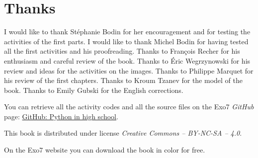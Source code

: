 
\clearemptydoublepage
\pagestyle{empty}\thispagestyle{empty}

\vspace*{\fill}

\section*{Thanks}


I would like to thank Stéphanie Bodin for her encouragement and for testing the activities of the first parts.
I would like to thank Michel Bodin for having tested all the first activities and his proofreading.
Thanks to François Recher for his enthusiasm and careful review of the book. 
Thanks to Éric Wegrzynowski for his review and ideas for the activities on the images. 
Thanks to Philippe Marquet for his review of the first chapters. Thanks to Kroum Tzanev for the model of the book.
Thanks to Emily Gubski for the English corrections.

\bigskip

\begin{center}
You can retrieve all the activity codes \Python{} and all the source files on the Exo7 \emph{GitHub} page:
\href{https://github.com/exo7math/python1-en-exo7}{\og{}GitHub: Python in high school\fg{}}.

\medskip




\end{center}


\vspace*{\fill}

\bigskip 

\begin{center}
\end{center}



\begin{center}
This book is distributed under license \emph{Creative Commons -- BY-NC-SA -- 4.0}.

On the Exo7 website you can download the book in color for free.
\end{center}




\printindex
{}

